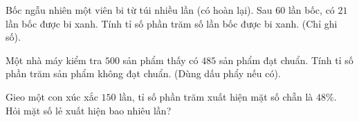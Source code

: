 \begin{ex} %
Bốc ngẫu nhiên một viên bi từ túi nhiều lần (có hoàn lại). Sau $60$ lần bốc, có $21$ lần bốc được bi xanh. Tính tỉ số phần trăm số lần bốc được bi xanh. (Chỉ ghi số).
\end{ex}

\begin{ex} %
Một nhà máy kiểm tra $500$ sản phẩm thấy có $485$ sản phẩm đạt chuẩn. Tính tỉ số phần trăm sản phẩm không đạt chuẩn. (Dùng dấu phẩy nếu có).
\end{ex}

\begin{ex} %
Gieo một con xúc xắc $150$ lần, tỉ số phần trăm xuất hiện mặt số chẵn là $48\%$. Hỏi mặt số lẻ xuất hiện bao nhiêu lần?
\end{ex}
